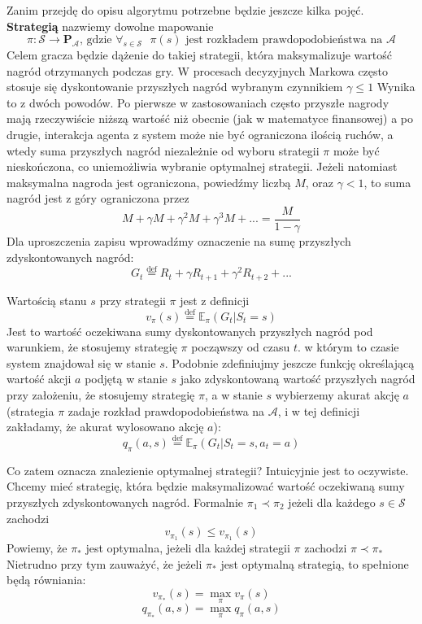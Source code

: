 \documentclass[licencjacka]{pracamgr}
\begin{document}
Zanim przejdę do opisu algorytmu potrzebne będzie jeszcze kilka pojęć. \textbf{Strategią} nazwiemy dowolne mapowanie 
$$\pi : \mathcal{S}\rightarrow\mathbf{P}_{\mathcal{A}} \text{, gdzie } \forall_{s\in\mathcal{S}} \text{ } \pi(s) \text {  jest rozkładem prawdopodobieństwa na } \mathcal{A}$$ 
Celem gracza będzie dążenie do takiej strategii, która maksymalizuje wartość nagród otrzymanych podczas gry.  W procesach decyzyjnych Markowa często stosuje się dyskontowanie przyszłych nagród wybranym czynnikiem $\gamma\leq1$ Wynika to z dwóch powodów. Po pierwsze w zastosowaniach często przyszłe nagrody mają rzeczywiście niższą wartość niż obecnie (jak w matematyce finansowej) a po drugie, interakcja agenta z system może nie być ograniczona ilością ruchów, a wtedy suma przyszłych nagród niezależnie od wyboru strategii $\pi$ może być nieskończona, co uniemożliwia wybranie optymalnej strategii. Jeżeli natomiast maksymalna nagroda jest ograniczona, powiedźmy liczbą $M$, oraz $\gamma<1$, to suma nagród jest z góry ograniczona przez
$$M+\gamma M +\gamma^{2}M+\gamma^{3}M+...  = \frac{M}{1-\gamma}$$
Dla uproszczenia zapisu wprowadźmy oznaczenie na sumę przyszłych zdyskontowanych nagród:
$$G_{t} \stackrel{\text{def}}{=} R_{t} + \gamma R_{t+1} + \gamma^{2}R_{t+2} +...$$

Wartością stanu $s$ przy strategii $\pi$ jest z definicji 
$$v_{\pi}(s)\stackrel{\text{def}}{=} \mathbb{E}_{\pi}(G_{t}| S_{t} = s) $$
Jest to wartość oczekiwana sumy dyskontowanych przyszłych nagród pod warunkiem, że stosujemy strategię $\pi$ począwszy od czasu $t$. w którym to czasie system znajdował się w stanie $s$. 
Podobnie zdefiniujmy jeszcze funkcję określającą wartość akcji $a$ podjętą w stanie $s$ jako zdyskontowaną wartość przyszłych nagród przy założeniu, że stosujemy strategię $\pi$, a w stanie $s$ wybierzemy akurat akcję $a$ (strategia $\pi$ zadaje rozkład prawdopodobieństwa na $\mathcal{A}$, i w tej definicji zakładamy, że akurat wylosowano akcję $a$):
$$q_{\pi}(a,s) \stackrel{\text{def}}{=} \mathbb{E}_{\pi}(G_{t}| S_{t} = s, a_{t} = a) $$

Co zatem oznacza znalezienie optymalnej strategii? Intuicyjnie jest to oczywiste. Chcemy mieć strategię, która będzie maksymalizować wartość oczekiwaną sumy przyszłych zdyskontowanych nagród. Formalnie $\pi_{1}\prec\pi_{2}$ jeżeli dla każdego $s\in\mathcal{S}$ zachodzi $$v_{\pi_{1}}(s)\leq v_{\pi_{1}}(s)$$
Powiemy, że $\pi_{*}$ jest optymalna, jeżeli dla każdej strategii $\pi$ zachodzi   $\pi\prec\pi_{*}$ Nietrudno przy tym zauważyć, że jeżeli $\pi_{*}$ jest optymalną strategią, to spełnione będą równiania:
$$v_{\pi_{*}}(s) =\max_{\pi} v_{\pi}(s)$$ $$q_{\pi_{*}}(a,s) = \max_{\pi} q_{\pi}(a,s)$$
\end{document}
